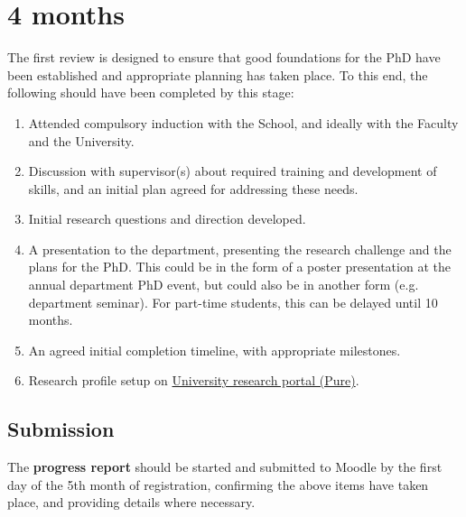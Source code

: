 \documentclass[12pt,a4paper]{article}
\begin{document}
\section{4 months}
The first review is designed to ensure that good foundations for the PhD have been established and appropriate planning has taken place. To this end, the following should have been completed by this stage:
\begin{enumerate}
\item Attended compulsory induction with the School, and ideally with the Faculty and the University.
\item Discussion with supervisor(s) about required training and development of skills, and an initial plan agreed for addressing these needs.
\item Initial research questions and direction developed.
\item A presentation to the department, presenting the research challenge and the plans for the PhD. This could be in the form of a poster presentation at the annual department PhD event, but could also be in another form (e.g. department seminar). For part-time students, this can be delayed until 10 months.
\item An agreed initial completion timeline, with appropriate milestones.
\item Research profile setup on \href{https://pure.lancs.ac.uk}{University research portal (Pure)}.
\end{enumerate}

\subsection{Submission}
The \textbf{progress report} should be started and submitted to Moodle by the first day of the 5th month of registration, confirming the above items have taken place, and providing details where necessary.
\end{document}
